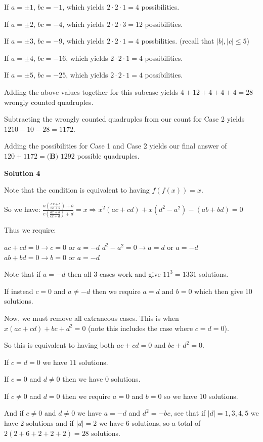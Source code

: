 \begin{enumerate}
 If $a=\pm 1$, $bc=-1$, which yields $2\cdot 2 \cdot 1=4$ possibilities.

 If $a=\pm 2$, $bc=-4$, which yields $2\cdot 2\cdot 3=12$ possibilities.

 If $a=\pm 3$, $bc=-9$, which yields $2\cdot 2\cdot 1=4$ possbilities. (recall that $|b|,|c|\leq 5$)

 If $a=\pm 4$, $bc=-16$, which yields $2\cdot 2\cdot 1=4$ possibilities.

 If $a=\pm 5$, $bc=-25$, which yields $2\cdot 2\cdot 1=4$ possibilities.

 Adding the above values together for this subcase yields $4+12+4+4+4=28$ wrongly counted quadruples.

 Subtracting the wrongly counted quadruples from our count for Case 2 yields $1210-10-28=1172$.

 Adding the possibilities for Case 1 and Case 2 yields our final answer of $120+1172=\boxed{\textbf{(B) }1292}$ possible quadruples.

 



\textbf{Solution 4}

Note that the condition is equivalent to having $f(f(x))=x$.

 So we have: $\frac{a(\frac{ax+b}{cx+d})+b}{c(\frac{ax+b}{cx+d})+d} = x \Rightarrow x^2(ac+cd)+x(d^2-a^2)-(ab+bd)=0$ 

 Thus we require: 

 $ac+cd = 0 \rightarrow c=0$ or $a = -d$
$d^2-a^2 = 0 \rightarrow a = d$ or $a = -d$
$ab+bd = 0 \rightarrow b=0$ or $a = -d$ 

 Note that if $a = -d$ then all 3 cases work and give $11^3=1331$ solutions. 

 If instead $c=0$ and $a \neq -d$ then we require $a=d$ and $b=0$ which then give $10$ solutions.

 Now, we must remove all extraneous cases. This is when $x(ac+cd)+bc+d^2 = 0$ (note this includes the case where $c=d=0$).

 So this is equivalent to having both $ac+cd = 0$ and $bc + d^2 = 0.$

 If $c = d = 0$ we have $11$ solutions.

 If $c = 0$ and $d \neq 0$ then we have $0$ solutions.

 If $c \neq 0$ and $d = 0$ then we require $a=0$ and $b=0$ so we have $10$ solutions.

 And if $c \neq 0$ and $d \neq 0$ we have $a = -d$ and $d^2 = -bc$, see that if $\left|d\right|=1,3,4,5$ we have $2$ solutions and if $\left|d\right|=2$ we have $6$ solutions, so a total of $2(2+6+2+2+2) = 28$ solutions.


\end{enumerate}
